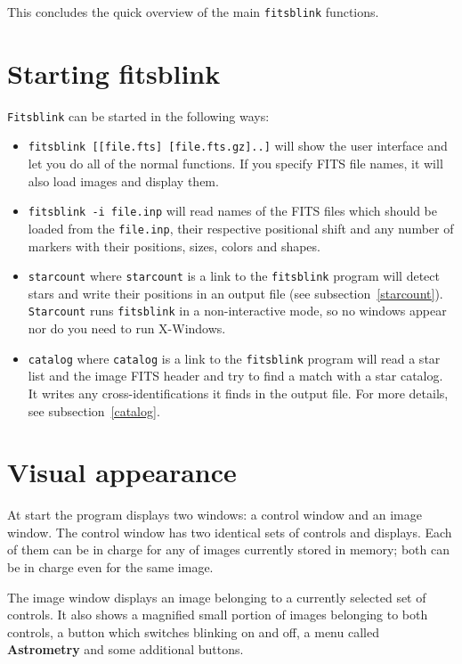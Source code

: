 \documentclass[11pt]{article}
\begin{document}
This concludes the quick overview of the main \verb=fitsblink=
functions.


\section{Starting fitsblink}

\verb=Fitsblink= can be started in the following ways:

\begin{itemize}
\item \verb=fitsblink [[file.fts] [file.fts.gz]..]= will show the user
interface and let you do all of the normal functions.  If you specify
FITS file names, it will also load images and display them.
\item \verb=fitsblink -i file.inp= will read names of the FITS files
which should be loaded from the \verb=file.inp=, their respective
positional shift and any number of markers with their positions,
sizes, colors and shapes.
\item \verb=starcount= where \verb=starcount= is a link to the
\verb=fitsblink= program will detect stars and write their positions
in an output file (see subsection~\ref{starcount}).  \verb=Starcount=
runs \verb=fitsblink= in a non-interactive mode, so no windows appear
nor do you need to run X-Windows.
\item \verb=catalog= where \verb=catalog= is a link to the
\verb=fitsblink= program will read a star list and the image FITS
header and try to find a match with a star catalog.  It writes any
cross-identifications it finds in the output file.  For more details,
see subsection~\ref{catalog}.

\end{itemize}

\section{Visual appearance}

At start the program displays two windows: a control window and an
image window.  The control window has two identical sets of controls
and displays.  Each of them can be in charge for any of images
currently stored in memory; both can be in charge even for the same
image.  

The image window displays an image belonging to a currently selected
set of controls.  It also shows a magnified small portion of images
belonging to both controls, a button which switches blinking on and
off, a menu called \textbf{Astrometry} and some additional buttons.
\end{document}
